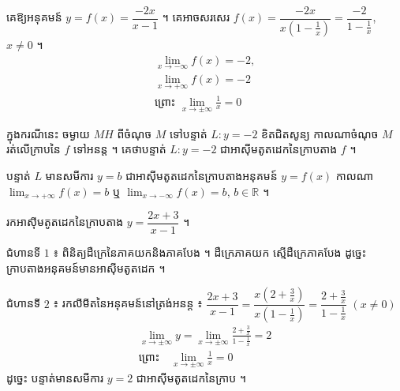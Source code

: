 \begin{example}[ឧទាហរណ៍]
គេឱ្យអនុគមន៍ $y = f(x) = \dfrac{-2x}{x - 1}$ ។ គេអាចសរសេរ $f(x) = \dfrac{-2x}{x\left(1 - \frac{1}{x}\right)} = \dfrac{-2}{1 - \frac{1}{x}}$, $x \ne 0$ ។
\[
\begin{gathered}
\lim_{x \to -\infty} f(x) = -2,\\
\lim_{x \to +\infty} f(x) = -2\\
\text{ព្រោះ } \lim_{x \to \pm\infty}\frac{1}{x} = 0
\end{gathered}
\]
\end{example}
ក្នុងករណីនេះ ចម្ងាយ $MH$ ពីចំណុច $M$ ទៅបន្ទាត់ $L : y = -2$ ខិតជិតសូន្យ កាលណាចំណុច $M$ រត់លើក្រាបនៃ $f$ ទៅអនន្ត ។ គេថាបន្ទាត់ $L : y = -2$ ជាអាស៊ីមតូតដេកនៃក្រាបតាង $f$ ។

\begin{center}
\end{center}

\begin{formulaBox}[ជាទូទៅ]
បន្ទាត់ $L$ មានសមីការ $y = b$ ជាអាស៊ីមតូតដេកនៃក្រាបតាងអនុគមន៍ $y = f(x)$ កាលណា $\displaystyle\lim_{x \to +\infty} f(x) = b$ ឬ $\displaystyle\lim_{x \to -\infty} f(x) = b$, $b \in \mathbb{R}$ ។
\end{formulaBox}

\begin{example}[លំហាត់គំរូ]
រកអាស៊ីមតូតដេកនៃក្រាបតាង $y = \dfrac{2x + 3}{x - 1}$ ។
\end{example}
\ans
ជំហានទី $1$ ៖ ពិនិត្យដឺក្រេនៃភាគយកនិងភាគបែង ។ ដឺក្រេភាគយក ស្មើដឺក្រេភាគបែង ដូច្នេះក្រាបតាងអនុគមន៍មានអាស៊ីមតូតដេក ។

ជំហានទី $2$ ៖ រកលីមីតនៃអនុគមន៍នៅត្រង់អនន្ត ៖ $\dfrac{2x + 3}{x - 1} = \dfrac{x\left(2 + \frac{3}{x}\right)}{x\left(1 - \frac{1}{x}\right)} = \dfrac{2 + \frac{3}{x}}{1 - \frac{1}{x}}$ $(x \ne 0)$
\[
\begin{gathered}
\lim_{x \to \pm\infty} y = \lim_{x \to \pm\infty}\frac{2 + \frac{3}{x}}{1 - \frac{1}{x}} = 2\\
\text{ព្រោះ} \quad \lim_{x \to \pm\infty}\frac{1}{x} = 0
\end{gathered}
\]
ដូច្នេះ បន្ទាត់មានសមីការ $y = 2$ ជាអាស៊ីមតូតដេកនៃក្រាប ។

